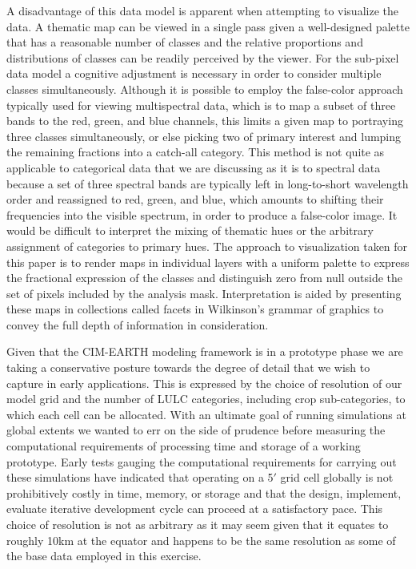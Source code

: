 A disadvantage of this data model is apparent when attempting to
visualize the data.  A thematic map can be viewed in a single pass
given a well-designed palette that has a reasonable number of classes
and the relative proportions and distributions of classes can be
readily perceived by the viewer.  For the sub-pixel data model a
cognitive adjustment is necessary in order to consider multiple
classes simultaneously.  Although it is possible to employ the
false-color approach typically used for viewing multispectral data,
which is to map a subset of three bands to the red, green, and blue
channels, this limits a given map to portraying three classes
simultaneously, or else picking two of primary interest and lumping
the remaining fractions into a catch-all category.  This method is not
quite as applicable to categorical data that we are discussing as it
is to spectral data because a set of three spectral bands are
typically left in long-to-short wavelength order and reassigned to
red, green, and blue, which amounts to shifting their frequencies into
the visible spectrum, in order to produce a false-color image.  It
would be difficult to interpret the mixing of thematic hues or the
arbitrary assignment of categories to primary hues.  The approach to
visualization taken for this paper is to render maps in individual
layers with a uniform palette to express the fractional expression of
the classes and distinguish zero from null outside the set of pixels
included by the analysis mask.  Interpretation is aided by presenting
these maps in collections called facets in Wilkinson's
\citeyearpar{Wilkinson2005} grammar of graphics to convey the full
depth of information in consideration.

Given that the CIM-EARTH modeling framework is in a prototype phase we
are taking a conservative posture towards the degree of detail that we
wish to capture in early applications.  This is expressed by the
choice of resolution of our model grid and the number of LULC
categories, including crop sub-categories, to which each cell can be
allocated.  With an ultimate goal of running simulations at global
extents we wanted to err on the side of prudence before measuring the
computational requirements of processing time and storage of a working
prototype.  Early tests gauging the computational requirements for
carrying out these simulations have indicated that operating on a 5$'$
grid cell globally is not prohibitively costly in time, memory, or
storage and that the design, implement, evaluate iterative development
cycle can proceed at a satisfactory pace.  This choice of resolution
is not as arbitrary as it may seem given that it equates to roughly
10km at the equator and happens to be the same resolution as some of
the base data employed in this exercise.

